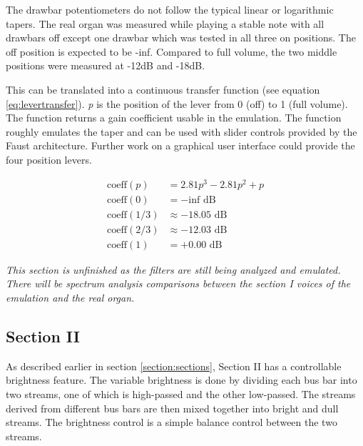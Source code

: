 \documentclass[11pt,a4paper]{article}
\begin{document}
The drawbar potentiometers do not follow the typical linear or logarithmic tapers. The real organ was measured while playing a stable note with all drawbars off except one drawbar which was tested in all three on positions. The off position is expected to be -inf. Compared to full volume, the two middle positions were measured at -12dB and -18dB.

This can be translated into a continuous transfer function (see equation \ref{eq:levertransfer}). \emph{p} is the position of the lever from 0 (off) to 1 (full volume). The function returns a gain coefficient usable in the emulation. The function roughly emulates the taper and can be used with slider controls provided by the Faust architecture. Further work on a graphical user interface could provide the four position levers.

\begin{equation}
\label{eq:levertransfer}
\begin{split}
\mbox{coeff}(p) &= 2.81 p^3 - 2.81 p^2 + p \\
\mbox{coeff}(0) &= -\mbox{inf} \mbox{ dB}\\
\mbox{coeff}(1/3) &\approx -18.05 \mbox{ dB}\\
\mbox{coeff}(2/3) &\approx -12.03 \mbox{ dB}\\
\mbox{coeff}(1) &= +0.00 \mbox{ dB}
\end{split}
\end{equation}

\emph{This section is unfinished as the filters are still being analyzed and emulated. There will be spectrum analysis comparisons between the section I voices of the emulation and the real organ.}

\subsection{Section II}

As described earlier in section \ref{section:sections}, Section II has a controllable brightness feature. The variable brightness is done by dividing each bus bar into two streams, one of which is high-passed and the other low-passed. The streams derived from different bus bars are then mixed together into bright and dull streams. The brightness control is a simple balance control between the two streams. 

\end{document}
